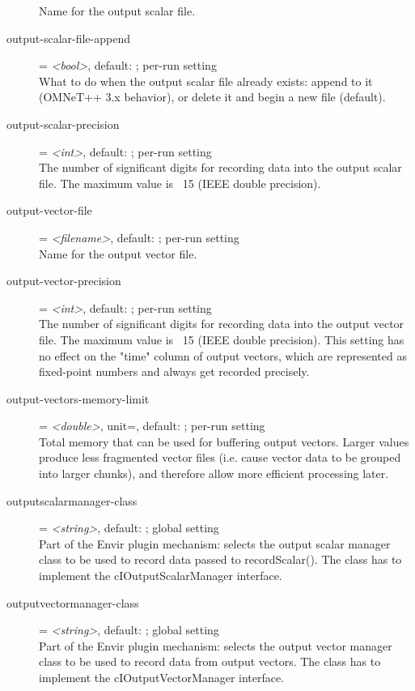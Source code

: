 \begin{description}
    Name for the output scalar file.
\item[output-scalar-file-append] = \textit{<bool>}, default: ; per-run setting \\
    What to do when the output scalar file already exists: append to it
    (OMNeT++ 3.x behavior), or delete it and begin a new file (default).
\item[output-scalar-precision] = \textit{<int>}, default: ; per-run setting \\
    The number of significant digits for recording data into the output scalar
    file. The maximum value is ~15 (IEEE double precision).
\item[output-vector-file] = \textit{<filename>}, default: ; per-run setting \\
    Name for the output vector file.
\item[output-vector-precision] = \textit{<int>}, default: ; per-run setting \\
    The number of significant digits for recording data into the output vector
    file. The maximum value is ~15 (IEEE double precision). This setting has no
    effect on the "time" column of output vectors, which are represented as
    fixed-point numbers and always get recorded precisely.
\item[output-vectors-memory-limit] = \textit{<double>}, unit=, default: ; per-run setting \\
    Total memory that can be used for buffering output vectors. Larger values
    produce less fragmented vector files (i.e. cause vector data to be grouped
    into larger chunks), and therefore allow more efficient processing later.
\item[outputscalarmanager-class] = \textit{<string>}, default: ; global setting \\
    Part of the Envir plugin mechanism: selects the output scalar manager class
    to be used to record data passed to recordScalar(). The class has to
    implement the cIOutputScalarManager interface.
\item[outputvectormanager-class] = \textit{<string>}, default: ; global setting \\
    Part of the Envir plugin mechanism: selects the output vector manager class
    to be used to record data from output vectors. The class has to implement
    the cIOutputVectorManager interface.

\end{description}
